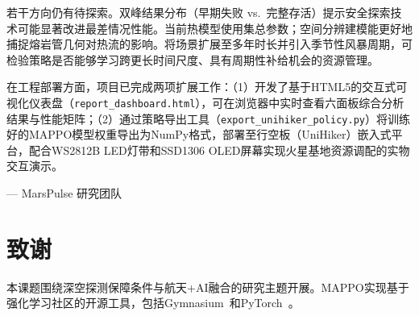 \documentclass[11pt,a4paper]{ctexart}
\begin{document}
若干方向仍有待探索。双峰结果分布（早期失败 vs.\ 完整存活）提示安全探索技术可能显著改进最差情况性能。当前热模型使用集总参数；空间分辨建模能更好地捕捉熔岩管几何对热流的影响。将场景扩展至多年时长并引入季节性风暴周期，可检验策略是否能够学习跨更长时间尺度、具有周期性补给机会的资源管理。

在工程部署方面，项目已完成两项扩展工作：（1）开发了基于HTML5的交互式可视化仪表盘（\texttt{report\_dashboard.html}），可在浏览器中实时查看六面板综合分析结果与性能矩阵；（2）通过策略导出工具（\texttt{export\_unihiker\_policy.py}）将训练好的MAPPO模型权重导出为NumPy格式，部署至行空板（UniHiker）嵌入式平台，配合WS2812B LED灯带和SSD1306 OLED屏幕实现火星基地资源调配的实物交互演示。

\vspace{20pt}
\begin{flushright}
  --- MarsPulse 研究团队
\end{flushright}

\section*{致谢}
本课题围绕深空探测保障条件与航天+AI融合的研究主题开展。MAPPO实现基于强化学习社区的开源工具，包括Gymnasium~\cite{gymnasium}和PyTorch~\cite{pytorch}。
\end{document}

